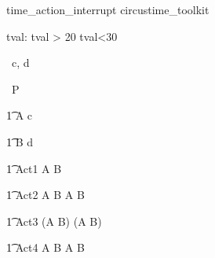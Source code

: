\begin{zsection}
   \SECTION time\_action\_interrupt \parents circustime\_toolkit
\end{zsection}


\begin{axdef}
   tval: \nat
\where
   tval > 20 \land tval<30
\end{axdef}



\begin{circus}
   \circchannel\ c, d \\
\end{circus}

\begin{circus}
    \circprocess\ P \circdef \circbegin \\
\end{circus}

\begin{circusaction}
    	\t1 A \circdef c \then \Skip \\
\end{circusaction}

\begin{circusaction}
        \t1 B \circdef d \then \Skip \\
\end{circusaction}
        

\begin{circusaction}
        \t1 Act1 \circdef A \circtimedinterrupt {} \rcirctime B \\
\end{circusaction}

\begin{circusaction}
	\t1 Act2 \circdef A \circtimedinterrupt {} \rcirctime B \circseq A \circtimedinterrupt {} \rcirctime B \\
\end{circusaction}

\begin{circusaction}
        \t1 Act3 \circdef (A \circtimedinterrupt {} \rcirctime B) \circseq (A \circtimedinterrupt {} \rcirctime B) \\
\end{circusaction}

\begin{circusaction}
	\t1 Act4 \circdef A \circtimedinterrupt {} \rcirctime B \extchoice A \circtimedinterrupt {} \rcirctime B \\
\end{circusaction}

